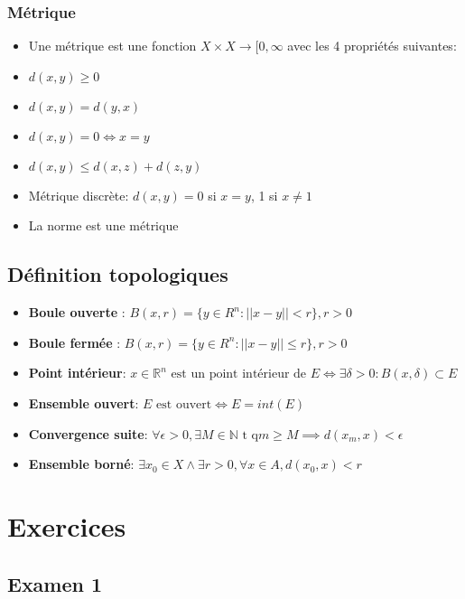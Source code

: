 \documentclass[12pt]{book}
\let\Bbb\mathbb
\theoremstyle{definition}
\begin{document}
\subsection{Métrique}
\begin{itemize}
    \item Une métrique est une fonction $X \times X \to [0, \infty$ avec les 4 propriétés suivantes:
    \item $d(x,y) \geq 0$
    \item $d(x,y) = d(y, x)$
    \item $d(x,y) = 0 \iff x = y$
    \item $d(x,y) \leq d(x, z) + d(z, y)$
    \item Métrique discrète: $d(x,y) = 0$ si $x = y$, 1 si $x \neq 1$
    \item La norme est une métrique
\end{itemize}
\section{Définition topologiques}
\begin{itemize}
    \item \textbf{Boule ouverte} : $B(x, r) = \{y \in R^n : || x - y || < r\}, r > 0$
    \item \textbf{Boule fermée} : $B(x, r) = \{y \in R^n : || x - y || \leq r\}, r > 0$
    \item \textbf{Point intérieur}: $x \in \Bbb R^n \text{ est un point intérieur de } E \iff \exists \delta > 0 : B(x, \delta) \subset E$
    \item \textbf{Ensemble ouvert}: $E\text{ est ouvert} \iff E = int(E)$
    \item \textbf{Convergence suite}: $\forall \epsilon > 0, \exists M \in \Bbb N \text{ t q} m \geq M \implies d(x_m, x) < \epsilon$
    \item \textbf{Ensemble borné}: $\exists x_0 \in X \land \exists r > 0, \forall x \in A, d(x_0, x) < r$
\end{itemize}

\chapter{Exercices}
\section{Examen 1}
\end{document}

